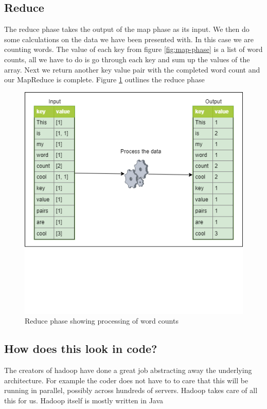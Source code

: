\subsection{Reduce}

The reduce phase takes the output of the map phase as its input. We then do some calculations on the data we have been presented with. In this case we are counting words. The value of each key from figure \ref{fig:map-phase} is a list of word counts, all we have to do is go through each key and sum up the values of the array. Next we return another key value pair with the completed word count and our MapReduce is complete. Figure \ref{fig:reduce-phase} outlines the reduce phase

\begin{figure}[H]
  \includegraphics[width=\linewidth]{./images/reduce-phase.png}
  \caption{Reduce phase showing processing of word counts}
  \label{fig:reduce-phase}
\end{figure}

\subsection{How does this look in code?}

The creators of hadoop have done a great job abstracting away the underlying architecture. For example the coder does not have to to care that this will be running in parallel, possibly across hundreds of servers. Hadoop takes care of all this for us. 
Hadoop itself is mostly written in Java
